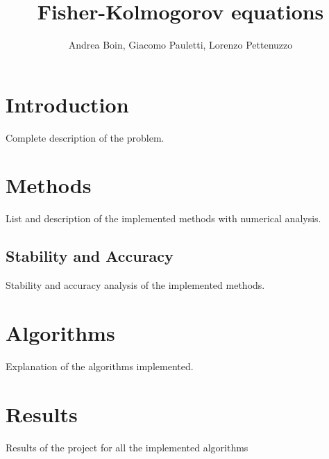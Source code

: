 \documentclass[12pt, letterpaper]{article}
\title{Fisher-Kolmogorov equations}
\author{Andrea Boin, Giacomo Pauletti, Lorenzo Pettenuzzo}
\date{}
\begin{document}
\maketitle
\pagebreak

\tableofcontents
\pagebreak

\section{Introduction}
Complete description of the problem.

\section{Methods}
List and description of the implemented methods with numerical analysis.
\subsection{Stability and Accuracy}
Stability and accuracy analysis of the implemented methods.

\section{Algorithms}
Explanation of the algorithms implemented.

\section{Results}
Results of the project for all the implemented algorithms
\end{document}
